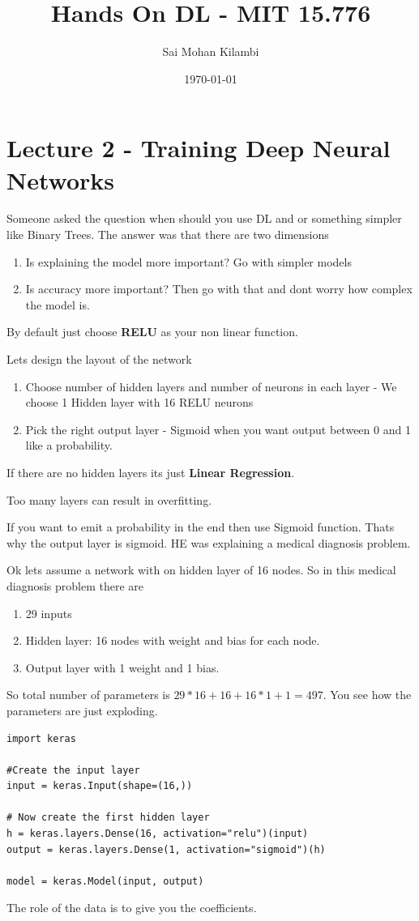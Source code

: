\documentclass[11pt]{article}
\title{Hands On DL - MIT 15.776}
\author{Sai Mohan Kilambi}
\date{\today}
\begin{document}
\maketitle

\setcounter{tocdepth}{4}
\tableofcontents

\newpage
\section{Lecture 2 - Training Deep Neural Networks}
Someone asked the question when should you use DL and or something simpler like Binary Trees. The answer was that there are two dimensions
\begin{enumerate}
	\item Is explaining the model more important? Go with simpler models
	\item Is accuracy more important? Then go with that and dont worry how complex the model is. 
\end{enumerate}

By default just choose \textbf{RELU} as your non linear function.

Lets design the layout of the network
\begin{enumerate}
	\item Choose number of hidden layers and number of neurons in each layer - We choose 1 Hidden layer with 16 RELU neurons
	\item Pick the right output layer - Sigmoid when you want output between 0 and 1 like a probability.
\end{enumerate}

If there are no hidden layers its just \textbf{Linear Regression}.

Too many layers can result in overfitting.

If you want to emit a probability in the end then use Sigmoid function. Thats why the output layer is sigmoid. HE was explaining a medical diagnosis problem.

Ok lets assume a network with on hidden layer of 16 nodes. So in this medical diagnosis problem there are 
\begin{enumerate}
	\item 29 inputs
	\item Hidden layer: 16 nodes with weight and bias for each node.
	\item Output layer with 1 weight and 1 bias.
\end{enumerate}

So total number of parameters is $29*16 + 16 + 16*1 +1 = 497$. You see how the parameters are just exploding. 

\begin{lstlisting}[style=pythonstyle]
import keras

#Create the input layer
input = keras.Input(shape=(16,)) 

# Now create the first hidden layer
h = keras.layers.Dense(16, activation="relu")(input)
output = keras.layers.Dense(1, activation="sigmoid")(h)

model = keras.Model(input, output)
\end{lstlisting}

The role of the data is to give you the coefficients.
\end{document}
